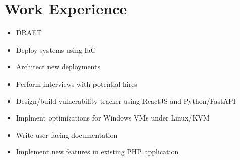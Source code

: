 \documentclass{resume}
\begin{document}
\section{Work Experience}

\begin{itemize}
    \item DRAFT
    \item Deploy systems using IaC
    \item Architect new deployments
    \item Perform interviews with potential hires
\end{itemize}

\begin{itemize}
    \item Design/build vulnerability tracker using ReactJS and Python/FastAPI
    \item Implment optimizations for Windows VMs under Linux/KVM
    \item Write user facing documentation
    \item Implement new features in existing PHP application
\end{itemize}
\end{document}
